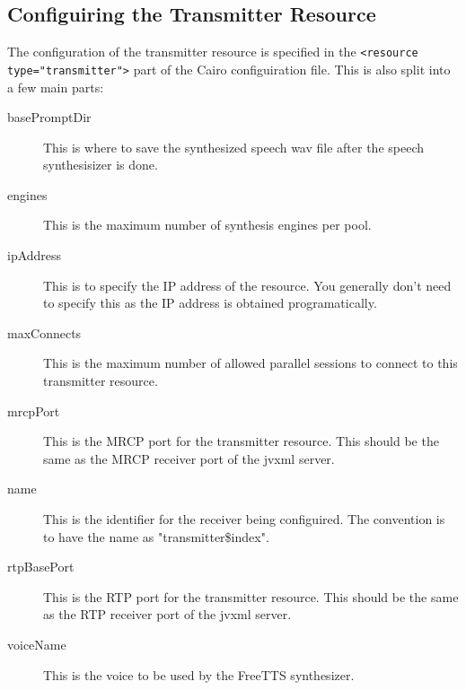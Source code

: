 \subsection{Configuiring the Transmitter Resource}
The configuration of the transmitter resource is specified in the \lstinline$<resource type="transmitter">$ part of the Cairo configuiration file.
This is also split into a few main parts:
\begin{description}
  \item[basePromptDir] This is where to save the synthesized speech wav file after the speech synthesisizer is done. 
  \item[engines] This is the maximum number of synthesis engines per pool.
  \item[ipAddress] This is to specify the IP address of the resource. You generally don't need to specify this as the IP address is obtained programatically.
  \item[maxConnects] This is the maximum number of allowed parallel sessions to connect to this transmitter resource.
  \item[mrcpPort] This is the MRCP port for the transmitter resource. This should be the same as the MRCP receiver port of the \ac{jvxml} server.
  \item[name] This is the identifier for the receiver being configuired. The convention is to have the name as "transmitter\$index".
  \item[rtpBasePort] This is the RTP port for the transmitter resource. This should be the same as the RTP receiver port of the \ac{jvxml} server.
  \item[voiceName] This is the voice to be used by the FreeTTS synthesizer.
\end{description}

